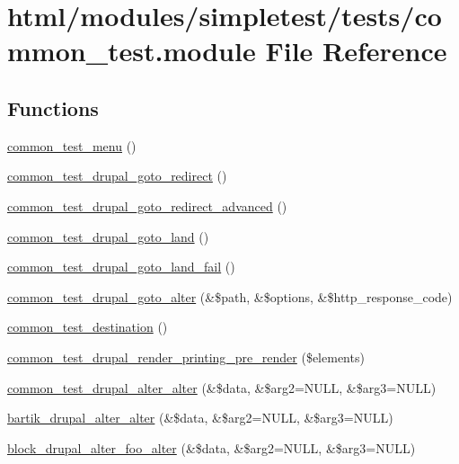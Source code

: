 \hypertarget{common__test_8module}{
\section{html/modules/simpletest/tests/common\_\-test.module File Reference}
\label{common__test_8module}
}
\subsection*{Functions}
\begin{DoxyCompactItemize}
\item 
\hyperlink{common__test_8module_a2e80428c43d4fa90cb01e1bfa223d98c}{common\_\-test\_\-menu} ()
\item 
\hyperlink{common__test_8module_abba823122539c8fec2c5ca988ccaf92b}{common\_\-test\_\-drupal\_\-goto\_\-redirect} ()
\item 
\hyperlink{common__test_8module_a395b0f500add60064382c0a497818c9c}{common\_\-test\_\-drupal\_\-goto\_\-redirect\_\-advanced} ()
\item 
\hyperlink{common__test_8module_a51a37e16cde782af5f1ef1fcb0bd17be}{common\_\-test\_\-drupal\_\-goto\_\-land} ()
\item 
\hyperlink{common__test_8module_ad10772459a2dce86e86db7d00fbca0c7}{common\_\-test\_\-drupal\_\-goto\_\-land\_\-fail} ()
\item 
\hyperlink{common__test_8module_ac2b8ae30fce12c338d3a688cc44a0f31}{common\_\-test\_\-drupal\_\-goto\_\-alter} (\&\$path, \&\$options, \&\$http\_\-response\_\-code)
\item 
\hyperlink{common__test_8module_a841ae04a545f50898da19cf111cc2677}{common\_\-test\_\-destination} ()
\item 
\hyperlink{common__test_8module_a6bd7008e00a42dda50d7e4aeb06781bd}{common\_\-test\_\-drupal\_\-render\_\-printing\_\-pre\_\-render} (\$elements)
\item 
\hyperlink{common__test_8module_a47684f53dbcdd2a299c3e9fa834fe7d7}{common\_\-test\_\-drupal\_\-alter\_\-alter} (\&\$data, \&\$arg2=NULL, \&\$arg3=NULL)
\item 
\hyperlink{common__test_8module_a41a0d34d1de16cce1b6532ccc5ae8245}{bartik\_\-drupal\_\-alter\_\-alter} (\&\$data, \&\$arg2=NULL, \&\$arg3=NULL)
\item 
\hyperlink{common__test_8module_a0ea8b96fa8bf0e390240e4a010208ec9}{block\_\-drupal\_\-alter\_\-foo\_\-alter} (\&\$data, \&\$arg2=NULL, \&\$arg3=NULL)

\end{DoxyCompactItemize}

